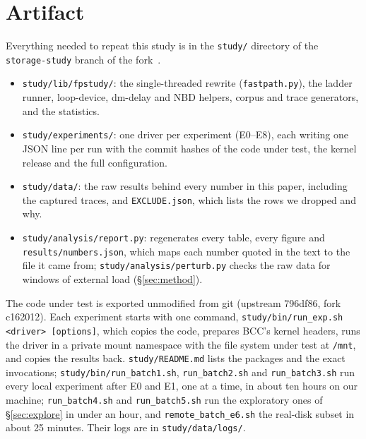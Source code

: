 \section{Artifact}
\label{sec:artifact}

Everything needed to repeat this study is in the \texttt{study/} directory of the
\texttt{storage-study} branch of the fork~\cite{studybranch}.
\begin{itemize}
\item \texttt{study/lib/fpstudy/}: the single-threaded rewrite (\texttt{fastpath.py}),
  the ladder runner, loop-device, dm-delay and NBD helpers, corpus and trace
  generators, and the statistics.
\item \texttt{study/experiments/}: one driver per experiment (E0--E8), each writing one
  JSON line per run with the commit hashes of the code under test, the kernel
  release and the full configuration.
\item \texttt{study/data/}: the raw results behind every number in this paper,
  including the captured traces, and \texttt{EXCLUDE.json}, which lists the rows we
  dropped and why.
\item \texttt{study/analysis/report.py}: regenerates every table, every figure and
  \texttt{results/numbers.json}, which maps each number quoted in the text to the
  file it came from; \texttt{study/\allowbreak analysis/\allowbreak perturb.py} checks the raw data for
  windows of external load (\S\ref{sec:method}).
\end{itemize}
The code under test is exported unmodified from git (upstream 796df86, fork
c162012). Each experiment starts with one command,
\texttt{study/bin/run\_exp.sh <driver> [options]}, which copies the code, prepares BCC's
kernel headers, runs the driver in a private mount namespace with the file system
under test at \texttt{/mnt}, and copies the results back. \texttt{study/README.md}
lists the packages and the exact invocations; \texttt{study/bin/run\_batch1.sh},
\texttt{run\_batch2.sh} and \texttt{run\_batch3.sh} run every local experiment after
E0 and E1, one at a time, in about ten hours on our machine; \texttt{run\_batch4.sh} and
\texttt{run\_batch5.sh} run the exploratory ones of \S\ref{sec:explore} in under an
hour, and \texttt{remote\_batch\_e6.sh} the real-disk subset in about 25 minutes. Their
logs are in \texttt{study/data/logs/}.
